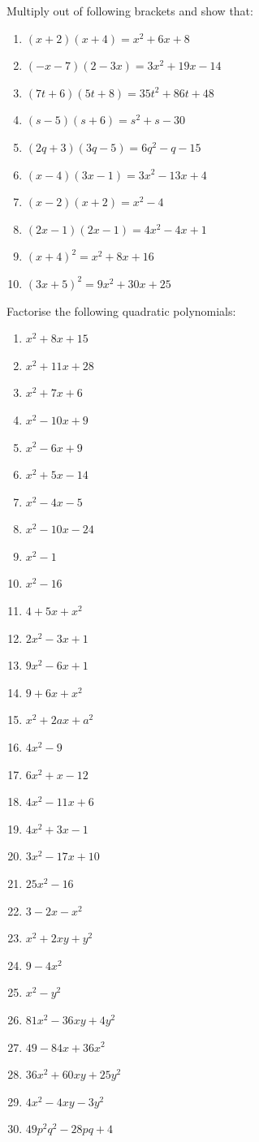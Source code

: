 \documentclass[
  12pt,
  oneside]{book}
\theoremstyle{definition}
\theoremstyle{definition}
\theoremstyle{definition}
\theoremstyle{definition}
\theoremstyle{remark}
\begin{document}
Multiply out of following brackets and show that:

\begin{enumerate}
\def\labelenumi{\arabic{enumi}.}
\item
  \((x+2)(x+4) = x^2 + 6x + 8\)
\item
  \((-x-7)(2-3x)=3x^2+19x-14\)
\item
  \((7t+6)(5t+8)=35t^2+86t+48\)
\item
  \((s-5)(s+6) = s^2+s-30\)
\item
  \((2q+3)(3q-5)=6q^2-q-15\)
\item
  \((x-4)(3x-1) = 3x^2-13x +4\)
\item
  \((x-2)(x+2)=x^2-4\)
\item
  \((2x-1)(2x-1) = 4x^2-4x+1\)
\item
  \((x+4)^2 = x^2 + 8x + 16\)
\item
  \((3x+5)^2=9x^2+30x+25\)
\end{enumerate}

Factorise the following quadratic polynomials:

\begin{enumerate}
\def\labelenumi{\arabic{enumi}.}
\setcounter{enumi}{10}
\item
  \(x^2+8x+15\)
\item
  \(x^2+11x+28\)
\item
  \(x^2+7x+6\)
\item
  \(x^2-10x+9\)
\item
  \(x^2-6x+9\)
\item
  \(x^2+5x-14\)
\item
  \(x^2-4x-5\)
\item
  \(x^2-10x-24\)
\item
  \(x^2-1\)
\item
  \(x^2-16\)
\item
  \(4+5x+x^2\)
\item
  \(2x^2-3x+1\)
\item
  \(9x^2-6x+1\)
\item
  \(9+6x+x^2\)
\item
  \(x^2+2ax+a^2\)
\item
  \(4x^2-9\)
\item
  \(6x^2+x-12\)
\item
  \(4x^2-11x+6\)
\item
  \(4x^2+3x-1\)
\item
  \(3x^2 - 17x+10\)
\item
  \(25x^2-16\)
\item
  \(3-2x-x^2\)
\item
  \(x^2+2xy+y^2\)
\item
  \(9-4x^2\)
\item
  \(x^2-y^2\)
\item
  \(81x^2-36xy+4y^2\)
\item
  \(49-84x+36x^2\)
\item
  \(36x^2+60xy+25y^2\)
\item
  \(4x^2-4xy-3y^2\)
\item
  \(49p^2q^2 - 28pq +4\)
\end{enumerate}
\end{document}
